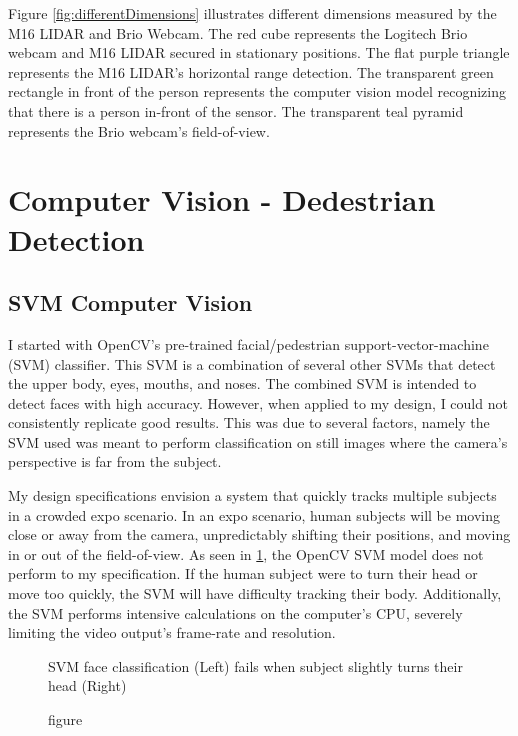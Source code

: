 \documentclass{article}
\begin{document}
  Figure \ref{fig:differentDimensions}  illustrates different dimensions measured by the M16 LIDAR and Brio Webcam.
  The red cube represents the Logitech Brio webcam and M16 LIDAR secured in stationary positions.
  The flat purple triangle represents the M16 LIDAR's horizontal range detection.
  The transparent green rectangle in front of the person represents the computer vision model recognizing that there is a person in-front of the sensor.
  The transparent teal pyramid represents the Brio webcam's field-of-view.

\section{Computer Vision - Dedestrian Detection}
  \subsection{SVM Computer Vision}
  I started with OpenCV's pre-trained facial/pedestrian support-vector-machine (SVM) classifier.
  This SVM is a combination of several other SVMs that detect the upper body, eyes, mouths, and noses.
  The combined SVM is intended to detect faces with high accuracy.
  However, when applied to my design, I could not consistently replicate good results.
  This was due to several factors, namely the SVM used was meant to perform classification on still images where the camera's perspective is far from the subject.

  My design specifications envision a system that quickly tracks multiple subjects in a crowded expo scenario.
  In an expo scenario, human subjects will be moving close or away from the camera, unpredictably shifting their positions, and moving in or out of the field-of-view.
  As seen in \ref{fig:svm}, the OpenCV SVM model does not perform to my specification.
  If the human subject were to turn their head or move too quickly, the SVM will have difficulty tracking their body.
  Additionally, the SVM performs intensive calculations on the computer's CPU, severely limiting the video output's frame-rate and resolution.

  \begin{figure}[h]
    \centering
    \caption{figure}{SVM face classification (Left) fails when subject slightly turns their head (Right)}
    \label{fig:svm}
  \end{figure}
\end{document}
